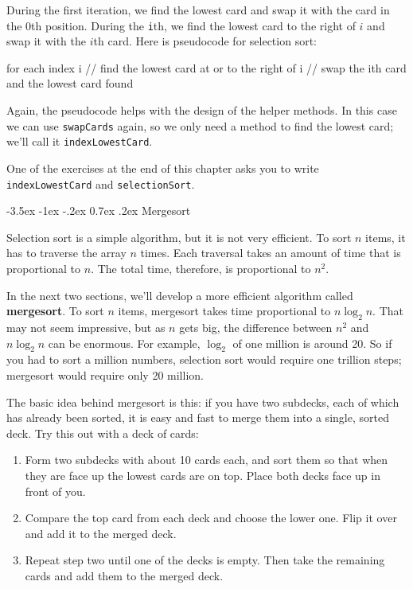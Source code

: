 \documentclass[12pt]{book}
\makeatletter
\theoremstyle{exercise}
\newcommand{\java}[1]{\verb"#1"}
\renewcommand{\section}{\@startsection{section}{1}{\z@}%
    {-3.5ex \@plus -1ex \@minus -.2ex}%
    {0.7ex \@plus.2ex}%
    {\normalfont\Large\bfseries}}
\newcommand{\java}[1]{\lstinline{#1}} %
\makeatother
\begin{document}
During the first iteration, we find the lowest card and swap it with the card in the 0th position.
During the \java{i}th, we find the lowest card to the right of $i$ and swap it with the $i$th card.
Here is pseudocode for selection sort:

\begin{code}
    for each index i {
        // find the lowest card at or to the right of i
        // swap the ith card and the lowest card found
    }
\end{code}


Again, the pseudocode helps with the design of the helper methods.
In this case we can use \java{swapCards} again, so we only need a method to find the lowest card; we'll call it \java{indexLowestCard}.

One of the exercises at the end of this chapter asks you to write \java{indexLowestCard} and \java{selectionSort}.


\section{Mergesort}
\label{mergesort}


Selection sort is a simple algorithm, but it is not very efficient.
To sort $n$ items, it has to traverse the array $n$ times.
Each traversal takes an amount of time that is proportional to $n$.
The total time, therefore, is proportional to $n^2$.

In the next two sections, we'll develop a more efficient algorithm called {\bf mergesort}.
To sort $n$ items, mergesort takes time proportional to $n \log_2 n$.
That may not seem impressive, but as $n$ gets big, the difference between $n^2$ and $n \log_2 n$ can be enormous.
For example, $\log_2$ of one million is around 20.
So if you had to sort a million numbers, selection sort would require one trillion steps; mergesort would require only 20 million.

The basic idea behind mergesort is this: if you have two subdecks, each of which has already been sorted, it is easy and fast to merge them into a single, sorted deck.
Try this out with a deck of cards:

\begin{enumerate}

\item Form two subdecks with about 10 cards each, and sort them so that when they are face up the lowest cards are on top.
Place both decks face up in front of you.

\item Compare the top card from each deck and choose the lower one.
Flip it over and add it to the merged deck.

\item Repeat step two until one of the decks is empty.
Then take the remaining cards and add them to the merged deck.

\end{enumerate}
\end{document}
